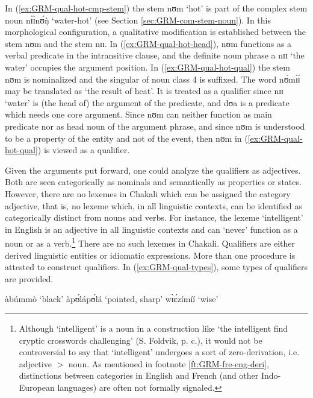 \begin{exe}
\begin{exe}
\begin{exe}
{\begin{exe}
\begin{exe}
\begin{exe}
\begin{exe}
\begin{exe}
\begin{exe}
\begin{exe}
\z 
 \z

In (\ref{ex:GRM-qual-hot-cmp-stem}) the stem {\sls nʊm} `hot' is part of the
complex stem noun {\sls nɪ̀ɪ̀nʊ́ŋ̀} `water-hot' (see Section
\ref{sec:GRM-com-stem-noun}).  In this morphological configuration, a
qualitative
modification is  established  between the stem {\sls nʊm} and the stem {\sls 
nɪɪ}.
In (\ref{ex:GRM-qual-hot-head}), {\sls nʊm}  functions as a verbal predicate in
the
intransitive clause, and the definite noun phrase {\sls a nɪɪ} `the water'
occupies
the argument position. In (\ref{ex:GRM-qual-hot-qual}) the stem {\sls nʊm} is
nominalized and the singular of  noun class 4 is suffixed. The word {\sls 
nʊ́mɪ́ɪ́} may be translated as  `the result of heat'. It is treated as a
qualifier since {\sls nɪɪ} `water' is  (the head of) the argument of the
predicate, and {\sls dʊa} is a predicate which needs   one core argument. Since 
{\sls nʊm}  can neither function as main predicate nor as head noun of the
argument phrase, and since {\sls nʊm}  is understood to be a property of the
entity
and not of the event, then {\sls nʊm} in (\ref{ex:GRM-qual-hot-qual}) is viewed 
as
a qualifier.


Given the arguments put forward, one could analyze the qualifiers as adjectives.
Both are  seen  categorically as nominals  and semantically as properties or
states.  However, there are no lexemes in Chakali  which can be assigned
the category adjective, that is, no lexeme which, in all  linguistic contexts,
can be identified as categorically distinct from nouns and verbs.  For instance,
the lexeme `intelligent' in English is an adjective in all linguistic contexts
and can `never' function as a noun or as  a verb.\footnote{Although
`intelligent' is a noun in a construction like `the
intelligent find cryptic crosswords challenging' (S. Foldvik, p. c.),  it would
not be
controversial to say that `intelligent'  undergoes a sort of  zero-derivation, 
i.e.
adjective $>$ noun.  As mentioned in footnote \ref{ft:GRM-fre-eng-deri},
distinctions between categories in English and French (and other Indo-European
languages) are often not formally signaled. }  There are no such lexemes in
Chakali. Qualifiers are
either derived
linguistic entities or idiomatic
expressions. More than one procedure is attested to construct qualifiers. In
(\ref{ex:GRM-qual-types}),   some types of qualifiers are provided.

\ea\label{ex:GRM-qual-types}
 
 \ea\label{ex:GRM-qual-t0} àbúmmò `black'  
  \ex\label{ex:GRM-qual-t1} àpʊ́lápʊ́lá `pointed, sharp'
  \ex\label{ex:GRM-qual-t2}  wɪ̀ɛ́zímíí  `wise' 



\end{exe}
\end{exe}
\end{exe}
\end{exe}
\end{exe}
\end{exe}
\end{exe}}
\end{exe}
\end{exe}
\end{exe}
